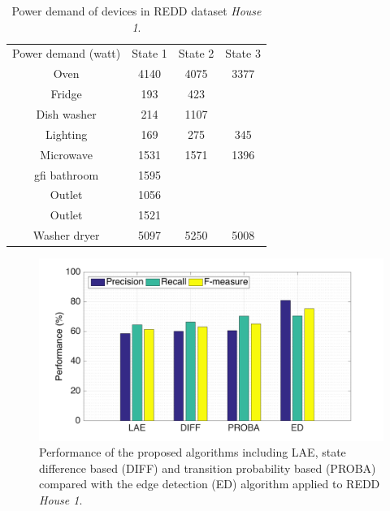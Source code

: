 \begin{table}
\caption{Power demand of devices in REDD dataset \emph{House 1}.}\label{table:t3}
\begin{center}
\begin{tabular}{|c|c|c|c|}
\hline
Power demand (watt)& State 1&State 2&State 3 \\ \hhline{|=|=|=|=|}
Oven&4140&4075&3377 \\ \hline
Fridge &193&423 & \\ \hline
Dish washer & 214& 1107 & \\ \hline
Lighting & 169 & 275 & 345 \\ \hline
Microwave &1531 & 1571 & 1396 \\ \hline
gfi bathroom & 1595 & & \\ \hline
Outlet & 1056 & & \\ \hline
Outlet & 1521 & & \\ \hline
Washer dryer & 5097 & 5250 & 5008 \\ \hline
\end{tabular}
\end{center}
\end{table}

\begin{figure}
\centering
\includegraphics[width=.8\textwidth]{./chapters/chapter3/images/R1_l1_perf.pdf} 
\caption{Performance of the proposed algorithms including LAE, state difference based (DIFF) and transition probability based (PROBA) compared with the edge detection (ED) algorithm applied to REDD \emph{House 1}.}
\label{fig:L7} 
\end{figure}

